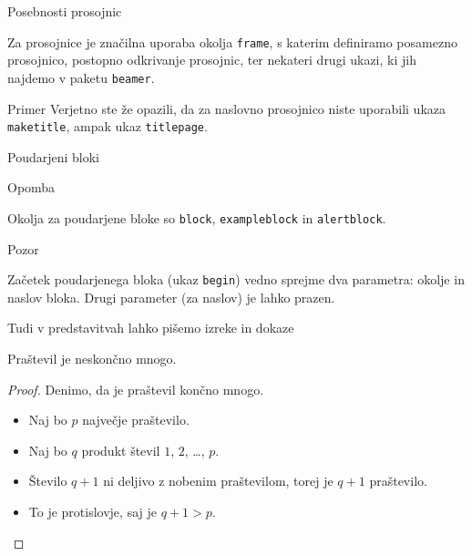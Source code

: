 \begin{frame}{Posebnosti prosojnic}

	Za prosojnice je značilna uporaba okolja \texttt{frame},
	s katerim definiramo posamezno prosojnico,
	\pause
	postopno odkrivanje prosojnic,
	\pause
	ter nekateri drugi ukazi, ki jih najdemo v paketu \texttt{beamer}.
	\pause
	\begin{exampleblock}{Primer}
		Verjetno ste že opazili, da za naslovno prosojnico niste uporabili
		ukaza \texttt{maketitle}, ampak ukaz \texttt{titlepage}.
	\end{exampleblock}
\end{frame}

\begin{frame}{Poudarjeni bloki}

		\begin{block}{Opomba}
		\end{block}
		Okolja za poudarjene bloke so \texttt{block}, \texttt{exampleblock} in \texttt{alertblock}.
		\begin{alertblock}{Pozor}
		\end{alertblock}
		Začetek poudarjenega bloka (ukaz \texttt{begin}) vedno sprejme 
		dva parametra: okolje in naslov bloka.
		Drugi parameter (za naslov) je lahko prazen. 

\end{frame}

\begin{frame}{Tudi v predstavitvah lahko pišemo izreke in dokaze}

	\begin{izrek}
	   Praštevil je neskončno mnogo.
	\end{izrek}
	\begin{proof}
	   Denimo, da je praštevil končno mnogo.
	   \begin{itemize}
		  \item <+-> Naj bo $p$ \alert<4>{največje} praštevilo.
		  \item <+-> Naj bo $q$ produkt števil $1$, $2$, \ldots, $p$.
		  \item <+-> Število $q+1$ ni deljivo z nobenim praštevilom, torej je $q+1$ praštevilo.
		  \item <+-> To je protislovje, saj je $q+1>p$. \qedhere
	   \end{itemize}
	\end{proof}
 \end{frame}
 
